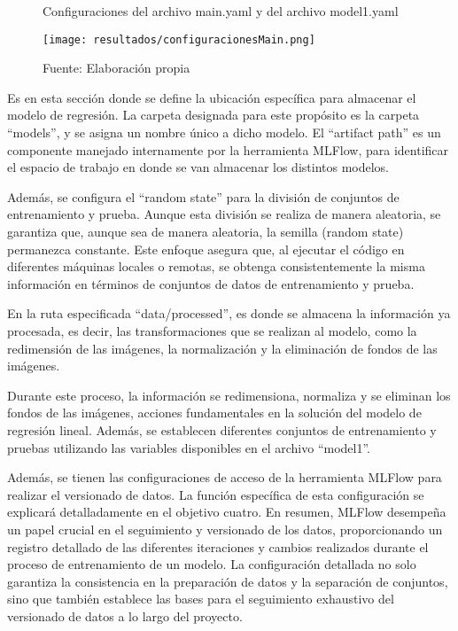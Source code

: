 \begin{figure}[h]
\centering
\caption{Configuraciones del archivo main.yaml y del archivo model1.yaml}
\texttt{[image: resultados/configuracionesMain.png]}
\caption*{\footnotesize Fuente: Elaboración propia}
\label{fig:figuraConfiguracionesMain}
\end{figure}

Es en esta sección donde se define la ubicación específica para almacenar el modelo de regresión. La carpeta designada para este propósito es la carpeta ``models'', y se asigna un nombre único a dicho modelo. El ``artifact path'' es un componente manejado internamente por la herramienta MLFlow, para identificar el espacio de trabajo en donde se van almacenar los distintos modelos. \newline

Además, se configura el ``random state'' para la división de conjuntos de entrenamiento y prueba. Aunque esta división se realiza de manera aleatoria, se garantiza que, aunque sea de manera aleatoria, la semilla (random state) permanezca constante. Este enfoque asegura que, al ejecutar el código en diferentes máquinas locales o remotas, se obtenga consistentemente la misma información en términos de conjuntos de datos de entrenamiento y prueba. \newline

En la ruta especificada ``data/processed'', es donde se almacena la información ya procesada, es decir, las transformaciones que se realizan al modelo, como la redimensión de las imágenes, la normalización y la eliminación de fondos de las imágenes. \newline

Durante este proceso, la información se redimensiona, normaliza y se eliminan los fondos de las imágenes, acciones fundamentales en la solución del modelo de regresión lineal. Además, se establecen diferentes conjuntos de entrenamiento y pruebas utilizando las variables disponibles en el archivo ``model1''. \newline

Además, se tienen las configuraciones de acceso de la herramienta MLFlow para realizar el versionado de datos. La función específica de esta configuración se explicará detalladamente en el objetivo cuatro. En resumen, MLFlow desempeña un papel crucial en el seguimiento y versionado de los datos, proporcionando un registro detallado de las diferentes iteraciones y cambios realizados durante el proceso de entrenamiento de un modelo. La configuración detallada no solo garantiza la consistencia en la preparación de datos y la separación de conjuntos, sino que también establece las bases para el seguimiento exhaustivo del versionado de datos a lo largo del proyecto. \newline

